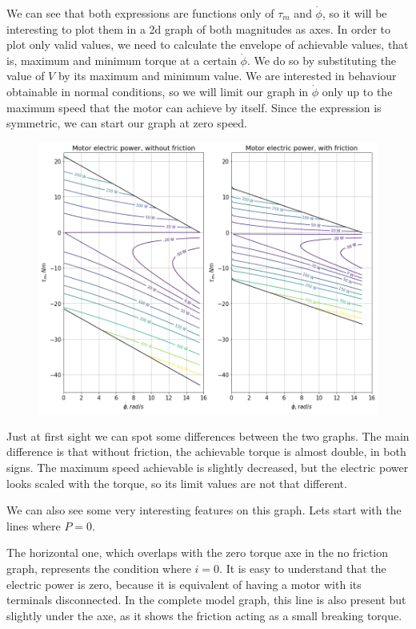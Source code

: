 \documentclass[12pt]{article}
\begin{document}
We can see that both expressions are functions only of $\tau_{m}$ and $\dot{\phi}$, so it will be interesting to plot them in a 2d graph of both magnitudes as axes. In order to plot only valid values, we need to calculate the envelope of achievable values, that is, maximum and minimum torque at a certain  $\dot{\phi}$. We do so by substituting the value of $V$ by its maximum and minimum value. We are interested in behaviour obtainable in normal conditions, so we will limit our graph in $\dot{\phi}$ only up to the maximum speed that the motor can achieve by itself. Since the expression is symmetric, we can start our graph at zero speed.
\begin{figure}[h]
	\centering
	\includegraphics[width=.9\linewidth]{motor_electric_power_w_and_wout_fricc}
	\label{fig:power_f_tau_speed}
\end{figure}

Just at first sight we can spot some differences between the two graphs. The main difference is that without friction, the achievable torque is almost double, in both signs. The maximum speed achievable is slightly decreased, but the electric power looks scaled with the torque, so its limit values are not that different.

We can also see some very interesting features on this graph. Lets start with the lines where $P = 0$. 

The horizontal one, which overlaps with the zero torque axe in the no friction graph, represents the condition where $i = 0$. It is easy to understand that the electric power is zero, because it is equivalent of having a motor with its terminals disconnected. In the complete model graph, this line is also present but slightly under the axe, as it shows the friction acting as a small breaking torque.
\end{document}
